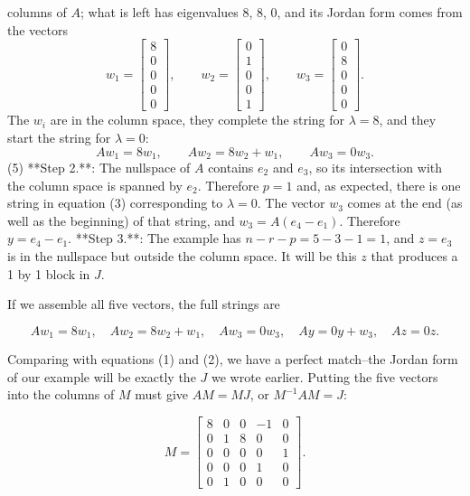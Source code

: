 columns of \(A\); what is left has eigenvalues 8, 8, 0, and its Jordan form comes from the vectors \[w_{1}=\begin{bmatrix}8\\ 0\\ 0\\ 0\\ 0\end{bmatrix},\qquad w_{2}=\begin{bmatrix}0\\ 1\\ 0\\ 0\\ 1\end{bmatrix},\qquad w_{3}=\begin{bmatrix}0\\ 8\\ 0\\ 0\\ 0\end{bmatrix}.\] The \(w_{i}\) are in the column space, they complete the string for \(\lambda=8\), and they start the string for \(\lambda=0\): \[Aw_{1}=8w_{1},\qquad Aw_{2}=8w_{2}+w_{1},\qquad Aw_{3}=0w_{3}.\] (5)
**Step 2.**: The nullspace of \(A\) contains \(e_{2}\) and \(e_{3}\), so its intersection with the column space is spanned by \(e_{2}\). Therefore \(p=1\) and, as expected, there is one string in equation (3) corresponding to \(\lambda=0\). The vector \(w_{3}\) comes at the end (as well as the beginning) of that string, and \(w_{3}=A(e_{4}-e_{1})\). Therefore \(y=e_{4}-e_{1}\).
**Step 3.**: The example has \(n-r-p=5-3-1=1\), and \(z=e_{3}\) is in the nullspace but outside the column space. It will be this \(z\) that produces a 1 by 1 block in \(J\).

If we assemble all five vectors, the full strings are

\[Aw_{1}=8w_{1},\quad Aw_{2}=8w_{2}+w_{1},\quad Aw_{3}=0w_{3},\quad Ay=0y+w_{3}, \quad Az=0z.\]

Comparing with equations (1) and (2), we have a perfect match--the Jordan form of our example will be exactly the \(J\) we wrote earlier. Putting the five vectors into the columns of \(M\) must give \(AM=MJ\), or \(M^{-1}AM=J\):

\[M=\begin{bmatrix}8&0&0&-1&0\\ 0&1&8&0&0\\ 0&0&0&0&1\\ 0&0&0&1&0\\ 0&1&0&0&0\end{bmatrix}.\]

